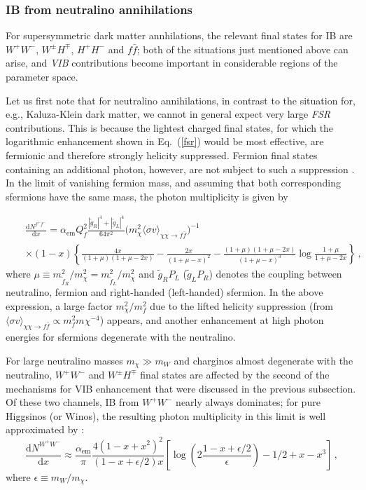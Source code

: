 \documentclass[a4paper,10pt,oneside]{book}
\begin{document}
\subsubsection{IB from neutralino annihilations}

For supersymmetric dark matter annhilations,  the relevant final states for IB are 
$W^+W^-$, $W^\pm H^\mp$, $H^+H^-$ and $f\bar f$; both of the situations just 
mentioned above can arise, and \emph{VIB} contributions become important in 
considerable regions of the parameter space.

Let us first note that for neutralino annihilations, in contrast to the situation 
for, e.g.,  Kaluza-Klein dark matter, we cannot in general expect very large 
\emph{FSR} contributions. This is because the lightest charged final states, for 
which the logarithmic enhancement shown in Eq.~(\ref{fsr}) would be most effective, 
are fermionic and therefore strongly helicity suppressed. Fermion final states 
containing an additional photon, however, are not subject to such a suppression 
\cite{Bergstrom:1989jr}. In the limit of vanishing fermion mass, and assuming that both 
corresponding sfermions have the same mass, the photon multiplicity is given by 
\cite{Bringmann:2007nk}

\begin{eqnarray}
  &&\frac{\mathrm{d}N^{f^+f^-}} {\mathrm{d}x}= 
\alpha_\mathrm{em}Q^2_f\frac{\left|\tilde g_R\right|^4+\left|\tilde 
g_L\right|^4}{64\pi^2} \Big(m_\chi^2 \langle\sigma v\rangle_{\chi\chi\rightarrow 
f\bar f}\Big)^{-1}\\
 &&\times(1-x)\left\{\frac{4x}{(1+\mu)(1+\mu-2x)}-\frac{2x}{(1+\mu-x)^2}
  -\frac{(1+\mu)(1+\mu-2x)}{(1+\mu-x)^3}\log\frac{1+\mu}{1+\mu-2x}\right\}\,,\nonumber
\end{eqnarray}
where $\mu\equiv m_{{\tilde f}_R}^2/m_\chi^2=m_{{\tilde f}_L}^2/m_\chi^2$ and 
$\tilde g_RP_L$ ($\tilde g_LP_R$) denotes the coupling between neutralino, fermion 
and right-handed (left-handed) sfermion. In the above expression, a large factor 
$m_\chi^2/m_f^2$ due to the lifted helicity suppression (from ${\langle\sigma 
v\rangle}_{\chi\chi\rightarrow f\bar f}\propto m_f^2m\chi^{-4}$) appears, and 
another enhancement at high photon energies for sfermions degenerate with the 
neutralino.

For large neutralino masses $m_\chi\gg m_W$ and charginos almost degenerate with 
the neutralino, $W^+W^-$ and $W^\pm H^\mp$ final states are affected by the second 
of the mechanisms for VIB enhancement that were discussed in the previous 
subsection. Of these two channels, IB from $W^+W^-$ nearly always dominates; for 
pure Higgsinos (or Winos), the resulting photon multiplicity in this limit is well 
approximated by \cite{Bringmann:2007nk,Bergstrom:2005ss}:
\begin{equation}
 \frac{\mathrm{d}N^{W^+W^-}} {\mathrm{d}x} \approx
  \frac{\alpha_\mathrm{em}}{\pi}\frac{4(1-x+x^2)^2}{(1-x+\epsilon/2)x}\left[\log\left(2\frac{1-x+\epsilon/2}{\epsilon}\right)-1/2+x-x^3\right]\,,
\end{equation}
where $\epsilon \equiv m_W/m_\chi$. 
\end{document}
